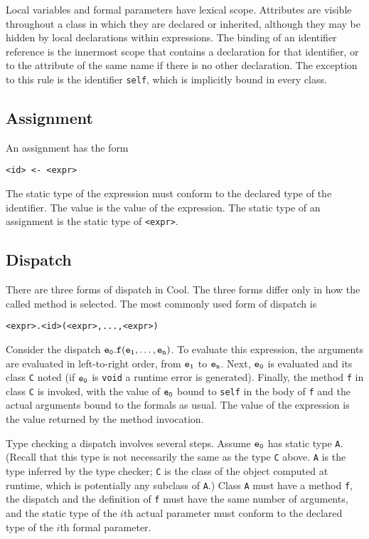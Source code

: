 Local variables and formal parameters have lexical scope.  Attributes
are visible throughout a class in which they are declared or
inherited, although they may be hidden by local declarations within
expressions.  The binding of an identifier reference is the innermost
scope that contains a declaration for that identifier, or to the
attribute of the same name if there is no other declaration.  The
exception to this rule is the identifier {\tt self}, which is
implicitly bound in every class.

\subsection{Assignment}
An assignment has the form
\begin{verbatim}
<id> <- <expr> 
\end{verbatim}
The static type of the expression must conform to the declared type of
the identifier.  The value is the value of the expression.
The static type of an assignment is the static type of {\tt <expr>}.

\subsection{Dispatch}

There are three forms of dispatch in Cool. 
The three forms differ only in how the called method is selected.
The most commonly used form of dispatch is
\begin{verbatim}
<expr>.<id>(<expr>,...,<expr>)
\end{verbatim}
Consider the dispatch $\tt e_0.f(e_1,\ldots,e_n)$.
To evaluate this expression, the arguments are evaluated in left-to-right
order, from $\tt e_1$ to $\tt e_n$.  Next, $\tt e_0$ is evaluated and
its class {\tt C} noted (if $\tt e_0$ is {\tt void} a runtime error is
generated).  Finally, the method {\tt f} in class {\tt C}
is invoked, with the value of $\tt e_0$ bound to {\tt self} in the body of
{\tt f} and the actual arguments bound to the formals as usual.
The value of the expression is the value returned by the method invocation.

Type checking a dispatch involves several steps.  Assume $\tt e_0$ has
static type {\tt A}.  (Recall that this type is not necessarily the
same as the type {\tt C} above.  {\tt A} is the type inferred by the
type checker; {\tt C} is the class of the object computed at runtime,
which is potentially any subclass of {\tt A}.)  Class {\tt A} must
have a method {\tt f}, the dispatch and the definition of {\tt f} must
have the same number of arguments, and the static type of the $i$th actual
parameter must conform to the declared type of the $i$th formal
parameter.

